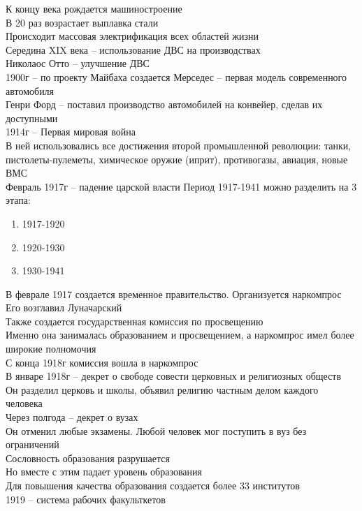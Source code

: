 \documentclass[12pt]{article}
\begin{document}
К концу века рождается машиностроение\\
В 20 раз возрастает выплавка стали\\
Происходит массовая электрификация всех областей жизни\\
Середина XIX века -- использование ДВС на производствах\\
Николаос Отто -- улучшение ДВС\\
1900г -- по проекту Майбаха создается Мерседес -- первая модель современного автомобиля\\
Генри Форд -- поставил производство автомобилей на конвейер, сделав их доступными\\
1914г -- Первая мировая война\\
В ней использовались все достижения второй промышленной революции: танки, пистолеты-пулеметы, химическое оружие (иприт), противогазы, авиация, новые ВМС\\
Февраль 1917г -- падение царской власти
Период 1917-1941 можно разделить на 3 этапа:
\begin{enumerate}
    \item 1917-1920
    \item 1920-1930
    \item 1930-1941
\end{enumerate}
В феврале 1917 создается временное правительство. Организуется наркомпрос\\
Его возглавил Луначарский\\
Также создается государственная комиссия по просвещению\\
Именно она занималась образованием и просвещением, а наркомпрос имел более широкие полномочия\\
С конца 1918г комиссия вошла в наркомпрос\\
В январе 1918г -- декрет о свободе совести церковных и религиозных обществ\\
Он разделил церковь и школы, объявил религию частным делом каждого человека\\
Через полгода -- декрет о вузах\\
Он отменил любые экзамены. Любой человек мог поступить в вуз без ограничений\\
Сословность образования разрушается\\
Но вместе с этим падает уровень образования\\
Для повышения качества образования создается более 33 институтов\\
1919 -- система рабочих факульткетов\\
\end{document}
